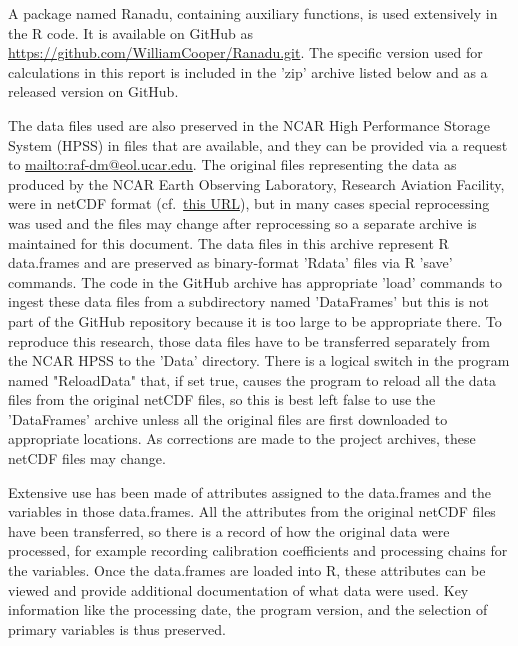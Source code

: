 \documentclass[12pt,twoside,english]{article}\usepackage[]{graphicx}\usepackage[]{color}
\let\OrgIndex\index
\renewcommand*{\index}[1]{\OrgIndex{#1}}
\begin{document}
{{\begin{appendices}
A package named Ranadu, containing auxiliary functions, is used extensively
in the R code. It is
available on GitHub as \href{https://github.com/WilliamCooper/Ranadu.git}{https://github.com/WilliamCooper/Ranadu.git}. The specific version used for calculations in this
report is included in the 'zip' archive listed below and as a released version on GitHub.

The data files used are also preserved in the NCAR High Performance
Storage System (HPSS) in files that are available, and they can be
provided via a request to \url{mailto:raf-dm@eol.ucar.edu}.
The original files representing the data as produced by the NCAR Earth
Observing Laboratory, Research Aviation Facility, were in netCDF format
(cf.~\href{http://www.unidata.ucar.edu/software/netcdf/}{this URL}),
but in many cases special reprocessing was used and the files may
change after reprocessing so a separate archive is maintained for
this document. The data files in this archive represent R data.frames
and are preserved as binary-format 'Rdata' files via R 'save' commands.
The code in the GitHub archive has appropriate 'load' commands to
ingest these data files from a subdirectory named 'DataFrames' but this
is not part of the GitHub repository because it is too large to be
appropriate there. To reproduce this research, those data files have
to be transferred separately from the NCAR HPSS to the 'Data' directory. 
There is a logical switch in the program named "ReloadData" that, if set true,
causes the program to reload all the data files from the original netCDF
files, so this is best left false to use the 'DataFrames' archive unless
all the original files are first downloaded to appropriate locations. As
corrections are made to the project archives, these netCDF files may change.

Extensive use has been made of attributes assigned to the data.frames
and the variables in those data.frames. All the attributes from the
original netCDF files have been transferred, so there is a record
of how the original data were processed, for example recording%
 calibration
coefficients and processing chains for the variables. Once the data.frames
are loaded into R, these attributes can be viewed and provide additional
documentation of what data were used. Key information like the processing
date, the program version, and the selection of primary variables
is thus preserved.


\end{appendices}}}
\end{document}
